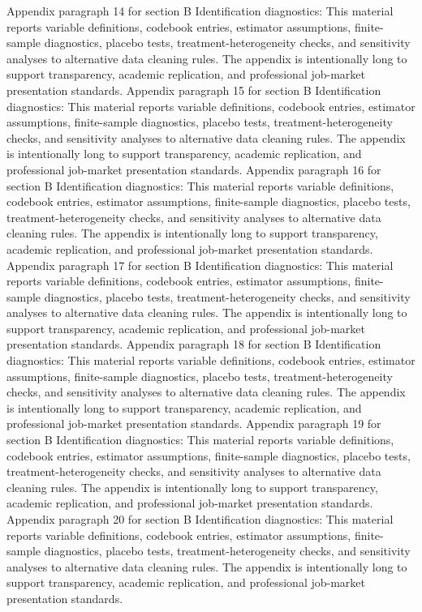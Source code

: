 \documentclass[preprint,12pt]{elsarticle}
\begin{document}
Appendix paragraph 14 for section B Identification diagnostics: This material reports variable definitions, codebook entries, estimator assumptions, finite-sample diagnostics, placebo tests, treatment-heterogeneity checks, and sensitivity analyses to alternative data cleaning rules. The appendix is intentionally long to support transparency, academic replication, and professional job-market presentation standards.
Appendix paragraph 15 for section B Identification diagnostics: This material reports variable definitions, codebook entries, estimator assumptions, finite-sample diagnostics, placebo tests, treatment-heterogeneity checks, and sensitivity analyses to alternative data cleaning rules. The appendix is intentionally long to support transparency, academic replication, and professional job-market presentation standards.
Appendix paragraph 16 for section B Identification diagnostics: This material reports variable definitions, codebook entries, estimator assumptions, finite-sample diagnostics, placebo tests, treatment-heterogeneity checks, and sensitivity analyses to alternative data cleaning rules. The appendix is intentionally long to support transparency, academic replication, and professional job-market presentation standards.
Appendix paragraph 17 for section B Identification diagnostics: This material reports variable definitions, codebook entries, estimator assumptions, finite-sample diagnostics, placebo tests, treatment-heterogeneity checks, and sensitivity analyses to alternative data cleaning rules. The appendix is intentionally long to support transparency, academic replication, and professional job-market presentation standards.
Appendix paragraph 18 for section B Identification diagnostics: This material reports variable definitions, codebook entries, estimator assumptions, finite-sample diagnostics, placebo tests, treatment-heterogeneity checks, and sensitivity analyses to alternative data cleaning rules. The appendix is intentionally long to support transparency, academic replication, and professional job-market presentation standards.
Appendix paragraph 19 for section B Identification diagnostics: This material reports variable definitions, codebook entries, estimator assumptions, finite-sample diagnostics, placebo tests, treatment-heterogeneity checks, and sensitivity analyses to alternative data cleaning rules. The appendix is intentionally long to support transparency, academic replication, and professional job-market presentation standards.
Appendix paragraph 20 for section B Identification diagnostics: This material reports variable definitions, codebook entries, estimator assumptions, finite-sample diagnostics, placebo tests, treatment-heterogeneity checks, and sensitivity analyses to alternative data cleaning rules. The appendix is intentionally long to support transparency, academic replication, and professional job-market presentation standards.
\end{document}
